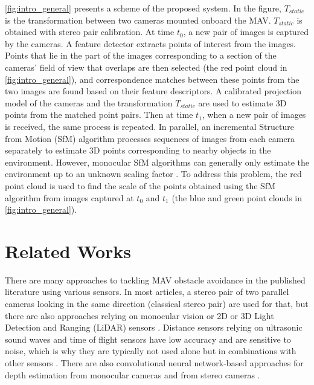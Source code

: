 \autoref{fig:intro_general} presents a scheme of the proposed system.
In the figure, $T_{static}$ is the transformation between two cameras mounted onboard the MAV.
$T_{static}$ is obtained with stereo pair calibration. 
At time $t_0$, a new pair of images is captured by the cameras.
A feature detector extracts points of interest from the images.
Points that lie in the part of the images corresponding to a section of the cameras' field of view that overlaps are then selected (the red point cloud in \autoref{fig:intro_general}), and correspondence matches between these points from the two images are found based on their feature descriptors.
A calibrated projection model of the cameras and the transformation $T_{static}$ are used to estimate 3D points from the matched point pairs.
Then at time $t_1$, when a new pair of images is received, the same process is repeated. 
In parallel, an incremental Structure from Motion (SfM) algorithm processes sequences of images from each camera separately to estimate 3D points corresponding to nearby objects in the environment. However, monocular SfM algorithms can generally only estimate the environment up to an unknown scaling factor \cite{SfM}. To address this problem, the red point cloud is used to find the scale of the points obtained using the SfM algorithm from images captured at $t_0$ and $t_1$ (the blue and green point clouds in \autoref{fig:intro_general}).

\section{Related Works}

There are many approaches to tackling MAV obstacle avoidance in the published literature using various sensors.
In most articles, a stereo pair of two parallel cameras looking in the same direction (classical stereo pair) \cite{Lin2021,Ruf2018,Oleinikova2015,Back2020} are used for that, but there are also approaches relying on monocular vision \cite{Mejias2010,Zhang2019,Bills2011} or 2D or 3D Light Detection and Ranging (LiDAR) sensors \cite{Ramasamy2016}.
Distance sensors relying on ultrasonic sound waves and time of flight sensors have low accuracy and are sensitive to noise, which is why they are typically not used alone but in combinations with other sensors \cite{Gageik2015, Nor2017}. 
There are also convolutional neural network-based approaches for depth estimation from monocular cameras \cite{Zhang2019,Yu2013, Park2020} and from stereo cameras \cite{Back2020}.

